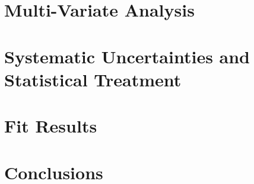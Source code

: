 \documentclass[UKenglish,texlive=2013]{\ATLASLATEXPATH atlasdoc}
\begin{document}
\section{Multi-Variate Analysis}
\label{sec:mva}



\section{Systematic Uncertainties and Statistical Treatment}
\label{sec:sys}


\clearpage
\newpage
\section{Fit Results}
\label{sec:result}





\section{Conclusions}
\label{sec:conclusion}



%
%
%
\end{document}

